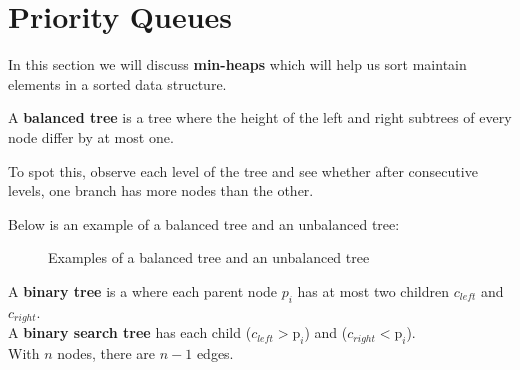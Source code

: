 \section{Priority Queues}
In this section we will discuss \textbf{min-heaps} which will help us sort
maintain elements in a sorted data structure.

\begin{Def}

    A \textbf{balanced tree} is a tree where the height of the left and right subtrees of every node differ by at most one.
\end{Def}

\begin{Tip}
    To spot this, observe each level of the tree and see whether after consecutive levels, one branch has more nodes than the other.
\end{Tip}
\newpage
\noindent
Below is an example of a balanced tree and an unbalanced tree:
\begin{figure}[h!]
    \centering
    \caption{Examples of a balanced tree and an unbalanced tree}
    \label{fig:balanced_unbalanced_trees}
\end{figure}
\begin{Def}

    A \textbf{binary tree} is a where each parent node $p_i$ has at most two children $c_{left}$ and $c_{right}$.\\
    A \textbf{binary search tree} has each child ($c_{left} > \text{p}_{i}$) and ($c_{right} < \text{p}_{i}$).\\

    \noindent
    With $n$ nodes, there are $n-1$ edges.
\end{Def}

